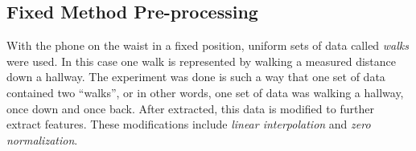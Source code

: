 \documentclass{sig-alternate}
\begin{document}
\subsection{Fixed Method Pre-processing}	
	With the phone on the waist in a fixed position, uniform sets of data called \textit{walks} were used. In this case one walk is represented by walking a measured distance down a hallway. The experiment was done is such a way that one set of data contained two ``walks'', or in other words, one set of data was walking a hallway, once down and once back. After extracted, this data is modified to further extract features. These modifications include \textit{linear interpolation} and \textit{zero normalization}. 
\end{document}

